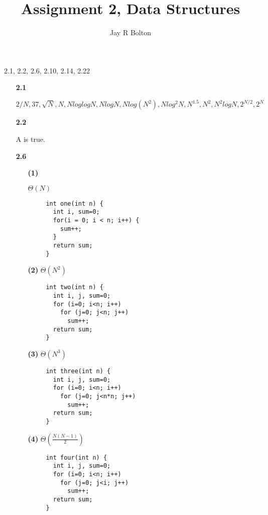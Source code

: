 \documentclass{article}
\title{Assignment 2, Data Structures}
\author{Jay R Bolton}
\begin{document}
\maketitle

2.1, 2.2, 2.6, 2.10, 2.14, 2.22

\begin{enumerate}
\item[\textbf{2.1}]

$$
2/N,37,\sqrt{N},N,NloglogN,NlogN,Nlog(N^2),Nlog^2N,N^{1.5},N^2,N^2logN,2^{N/2},2^N
$$

\item[\textbf{2.2}]

A is true.

\item[\textbf{2.6}]
 \begin{enumerate}
  I have found the exact complexities. I first turned each problem into a
  series of nested summations. Then I reduced them starting from the inside. I
  used the rules in the book for sums of squares and cubes, and had to google
  the sum of fourths.
  \item[\textbf{(1)}]

   $\Theta(N)$

   \begin{verbatim}
     int one(int n) {
       int i, sum=0;
       for(i = 0; i < n; i++) {
         sum++;
       }
       return sum;
     }
   \end{verbatim}

  \item[\textbf{(2)}]
   $\Theta(N^2)$

   \begin{verbatim}
     int two(int n) {
       int i, j, sum=0;
       for (i=0; i<n; i++)
         for (j=0; j<n; j++)
           sum++;
       return sum;
     }
   \end{verbatim}

  \item[\textbf{(3)}]
   $\Theta(N^3)$

   \begin{verbatim} 
     int three(int n) {
       int i, j, sum=0;
       for (i=0; i<n; i++)
         for (j=0; j<n*n; j++)
           sum++;
       return sum;
     }
   \end{verbatim}

  \item[\textbf{(4)}]
   $\Theta\left(\frac{N(N-1)}{2}\right)$

   \begin{verbatim} 
     int four(int n) {
       int i, j, sum=0;
       for (i=0; i<n; i++)
         for (j=0; j<i; j++)
           sum++;
       return sum;
     }
   \end{verbatim}


\end{enumerate}
\end{enumerate}
\end{document}
